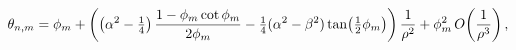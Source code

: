 \[\theta_{n,m}=\phi_{m}+\left(\left(\alpha^{2}-\tfrac{1}{4}\right)\frac{1-\phi_{%
m}\mathop{\cot\/}\nolimits\phi_{m}}{2\phi_{m}}-\tfrac{1}{4}(\alpha^{2}-\beta^{%
2})\mathop{\tan\/}\nolimits\!\left(\tfrac{1}{2}\phi_{m}\right)\right)\frac{1}{%
\rho^{2}}+\phi_{m}^{2}\mathop{O\/}\nolimits\!\left(\frac{1}{\rho^{3}}\right),\]
